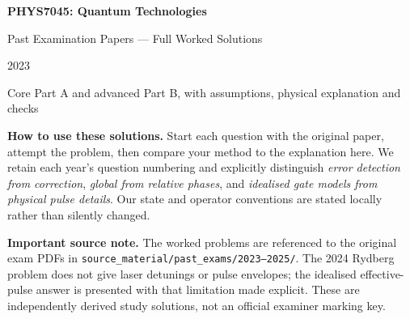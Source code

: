 \documentclass[10pt,a4paper]{article}
\begin{document}
\begin{center}
{\huge\bfseries PHYS7045: Quantum Technologies}\par\vspace{2mm}
{\Large\color{accent}Past Examination Papers --- Full Worked Solutions}\par\vspace{2mm}
{\small 2023 \quad\textbullet{} \quad\textbullet{}}\par\vspace{2mm}
{\small Core Part A and advanced Part B, with assumptions, physical explanation and checks}
\end{center}
\begin{idea}
\textbf{How to use these solutions.} Start each question with the original paper, attempt the problem, then compare your method to the explanation here. We retain each year's question numbering and explicitly distinguish \emph{error detection from correction}, \emph{global from relative phases}, and \emph{idealised gate models from physical pulse details}. Our state and operator conventions are stated locally rather than silently changed.
\end{idea}
\tableofcontents
\begin{examtip}
\textbf{Important source note.} The worked problems are referenced to the original exam PDFs in \texttt{source\_material/past\_exams/2023--2025/}. The 2024 Rydberg problem does not give laser detunings or pulse envelopes; the idealised effective-pulse answer is presented with that limitation made explicit. These are independently derived study solutions, not an official examiner marking key.
\end{examtip}



\end{document}
